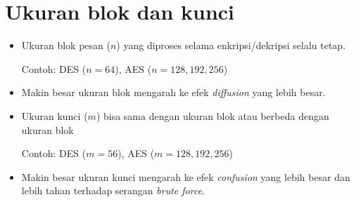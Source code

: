 \documentclass{article}
\begin{document}

\section*{Ukuran blok dan kunci}

\begin{itemize}
    \item Ukuran blok pesan ($n$) yang diproses selama enkripsi/dekripsi selalu tetap.
    
    Contoh: DES ($n = 64$), AES ($n = 128, 192, 256$)
    
    \item Makin besar ukuran blok mengarah ke efek \textit{diffusion} yang lebih besar.
    
    \item Ukuran kunci ($m$) bisa sama dengan ukuran blok atau berbeda dengan ukuran blok
    
    Contoh: DES ($m = 56$), AES ($m = 128, 192, 256$)
    
    \item Makin besar ukuran kunci mengarah ke efek \textit{confusion} yang lebih besar dan lebih tahan terhadap serangan \textit{brute force}.
\end{itemize}
\end{document}
